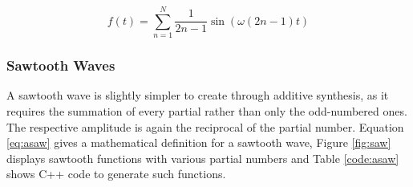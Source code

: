   \begin{equation}
    f(t) = \sum\limits_{n=1}^N \frac{1}{2n -1} \sin(\omega (2n - 1) t)
    \label{eq:asquare}
  \end{equation}

  \begin{figure}

    \TopFloatBoxes

    \begin{floatrow}



    \end{floatrow}

  \end{figure}

  \pagebreak

  \subsubsection{Sawtooth Waves}

  A sawtooth wave is slightly simpler to create through additive synthesis, as it requires the summation of every partial rather than only the odd-numbered ones. The respective amplitude is again the reciprocal of the partial number. Equation \ref{eq:asaw} gives a mathematical definition for a sawtooth wave, Figure \ref{fig:saw} displays sawtooth functions with various partial numbers and Table \ref{code:asaw} shows C++ code to generate such functions.

